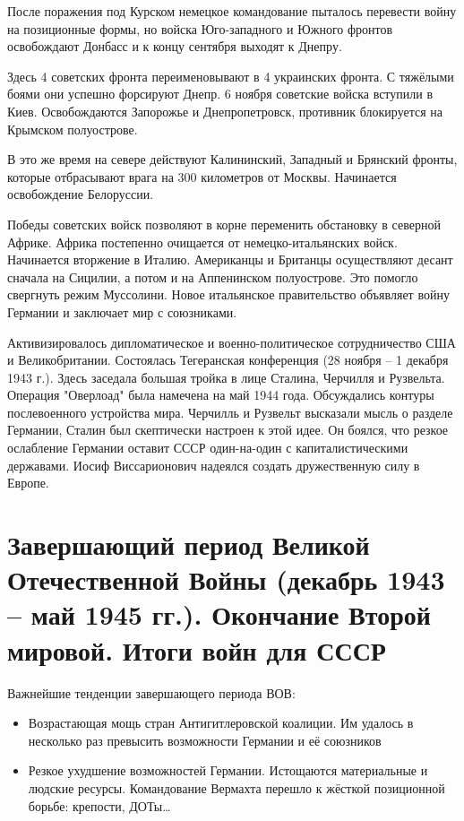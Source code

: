 \documentclass{article}
\begin{document}
После поражения под Курском немецкое командование пыталось перевести войну на позиционные формы, но  войска Юго-западного и Южного фронтов освобождают Донбасс и к концу сентября выходят к Днепру.

Здесь 4 советских фронта переименовывают в 4 украинских фронта. С тяжёлыми боями они успешно форсируют Днепр. 6 ноября советские войска вступили в Киев. Освобождаются Запорожье и Днепропетровск, противник блокируется на Крымском полуострове.

В это же время на севере действуют Калининский, Западный и Брянский фронты, которые отбрасывают врага на  300 километров от Москвы. Начинается освобождение Белоруссии.

Победы советских войск позволяют в корне переменить обстановку в северной Африке. Африка постепенно очищается от немецко-итальянских войск. Начинается вторжение в Италию. Американцы и Британцы осуществляют десант сначала на Сицилии, а потом и на Аппенинском полуострове. Это помогло свергнуть режим Муссолини. Новое итальянское правительство объявляет войну Германии и заключает мир с союзниками.

Активизировалось дипломатическое и военно-политическое сотрудничество США и Великобритании. Состоялась Тегеранская конференция (28 ноября -- 1 декабря 1943 г.). Здесь заседала большая тройка в лице Сталина, Черчилля и Рузвельта. Операция "Оверлоад" была намечена на май 1944 года. Обсуждались контуры послевоенного устройства мира. Черчилль и Рузвельт высказали мысль о разделе Германии, Сталин был скептически настроен к этой идее. Он боялся, что резкое ослабление Германии оставит СССР один-на-один с капиталистическими державами. Иосиф Виссарионович надеялся создать дружественную силу в Европе.

\section{Завершающий период Великой Отечественной Войны (декабрь 1943 -- май 1945 гг.). Окончание Второй мировой. Итоги войн для СССР}

Важнейшие тенденции завершающего периода ВОВ:
\begin{itemize}
    \item Возрастающая мощь стран Антигитлеровской коалиции. Им удалось в несколько раз превысить возможности Германии и её союзников
    \item Резкое ухудшение возможностей Германии. Истощаются материальные и людские ресурсы. Командование Вермахта перешло к жёсткой позиционной борьбе: крепости, ДОТы\dots
\end{itemize}
\end{document}
